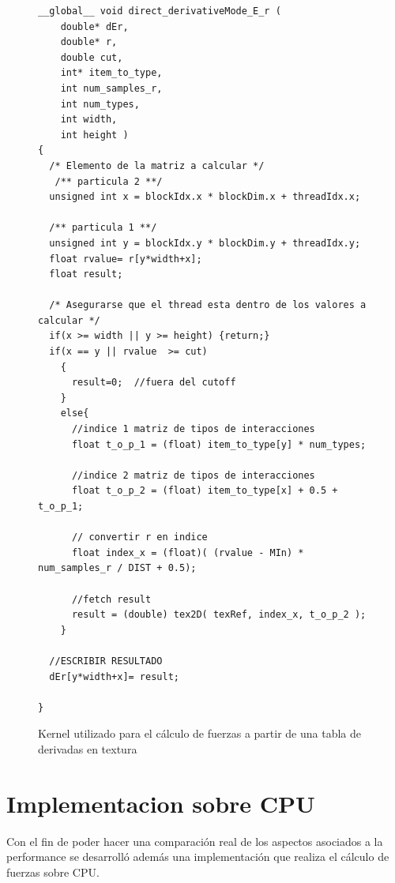 \begin{figure}[htbp]
    \begin{lstlisting}
__global__ void direct_derivativeMode_E_r (
    double* dEr,
    double* r, 
    double cut, 
    int* item_to_type, 
    int num_samples_r, 
    int num_types, 
    int width, 
    int height )
{ 
  /* Elemento de la matriz a calcular */
   /** particula 2 **/
  unsigned int x = blockIdx.x * blockDim.x + threadIdx.x;
  
  /** particula 1 **/
  unsigned int y = blockIdx.y * blockDim.y + threadIdx.y;	
  float rvalue= r[y*width+x]; 
  float result;
  
  /* Asegurarse que el thread esta dentro de los valores a calcular */
  if(x >= width || y >= height) {return;}
  if(x == y || rvalue  >= cut) 
    {
      result=0;  //fuera del cutoff
    }
    else{
      //indice 1 matriz de tipos de interacciones
      float t_o_p_1 = (float) item_to_type[y] * num_types;	
      
      //indice 2 matriz de tipos de interacciones
      float t_o_p_2 = (float) item_to_type[x] + 0.5 + t_o_p_1;	
      
      // convertir r en indice
      float index_x = (float)( (rvalue - MIn) * num_samples_r / DIST + 0.5);	
     
      //fetch result
      result = (double) tex2D( texRef, index_x, t_o_p_2 );
    }
   
  //ESCRIBIR RESULTADO 
  dEr[y*width+x]= result;

}
    \end{lstlisting}
    \caption{Kernel utilizado para el cálculo de fuerzas a partir de una tabla de derivadas en textura}
    \label{code:potentialsKernel}
\end{figure}



\section{Implementacion sobre CPU}

Con el fin de poder hacer una comparación real de los aspectos asociados a la performance se desarrolló además una implementación que realiza el cálculo de fuerzas sobre CPU.

